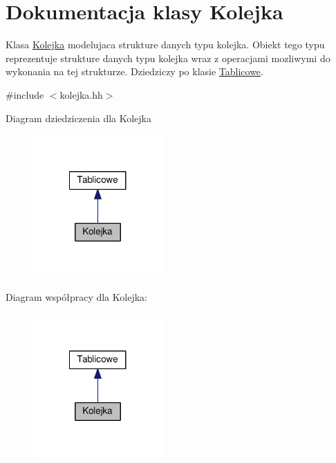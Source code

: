 \hypertarget{class_kolejka}{\section{Dokumentacja klasy Kolejka}
\label{class_kolejka}
}


Klasa \hyperlink{class_kolejka}{Kolejka} modelujaca strukture danych typu kolejka. Obiekt tego typu reprezentuje strukture danych typu kolejka wraz z operacjami mozliwymi do wykonania na tej strukturze. Dziedziczy po klasie \hyperlink{class_tablicowe}{Tablicowe}.  




{\ttfamily \#include $<$kolejka.\-hh$>$}



Diagram dziedziczenia dla Kolejka
\nopagebreak
\begin{figure}[H]
\begin{center}
\leavevmode
\includegraphics[width=140pt]{class_kolejka__inherit__graph}
\end{center}
\end{figure}


Diagram współpracy dla Kolejka\-:
\nopagebreak
\begin{figure}[H]
\begin{center}
\leavevmode
\includegraphics[width=140pt]{class_kolejka__coll__graph}
\end{center}
\end{figure}
